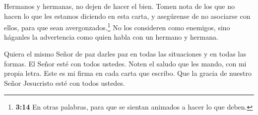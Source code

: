  Hermanos y hermanas, no dejen de hacer el bien.
 Tomen nota de los que no hacen lo que les estamos diciendo
en esta carta, y asegúrense de no asociarse con ellos, para que sean
avergonzados.\footnote{\textbf{3:14} En otras palabras, para que se
  sientan animados a hacer lo que deben.}  No los
consideren como enemigos, sino háganles la advertencia como quien habla
con un hermano y hermana.

 Quiera el mismo Señor de paz darles paz en todas las
situaciones y en todas las formas. El Señor esté con todos ustedes.
 Noten el saludo que les mando, con mi propia letra. Este
es mi firma en cada carta que escribo.  Que la gracia de
nuestro Señor Jesucristo esté con todos ustedes.

